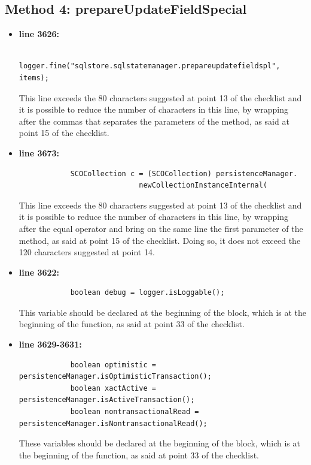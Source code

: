 \documentclass[18pt,oneside,a4paper, titlepage]{article}
\begin{document}
		\subsection{Method 4: prepareUpdateFieldSpecial}
		\begin{itemize}
			\item \textbf{line 3626:} \begin{lstlisting}
			logger.fine("sqlstore.sqlstatemanager.prepareupdatefieldspl", items);
			\end{lstlisting}
			\vspace{0.1cm}
			
			This line exceeds the 80 characters suggested at point 13 of the checklist and it is possible to reduce the number of characters in this line, by wrapping after the commas that separates the parameters of the method, as said at point 15 of the checklist.
			\item \textbf{line 3673:} \begin{lstlisting}
			SCOCollection c = (SCOCollection) persistenceManager.
							newCollectionInstanceInternal(
			\end{lstlisting}
			\vspace{0.1cm}
			This line exceeds the 80 characters suggested at point 13 of the checklist and it is possible to reduce the number of characters in this line, by wrapping after the equal operator and bring on the same line the first parameter of the method, as said at point 15 of the checklist. Doing so, it does not exceed the 120 characters suggested at point 14.
			\item \textbf{line 3622:} \begin{lstlisting}
			boolean debug = logger.isLoggable();
			\end{lstlisting}
			\vspace{0.1cm}
			This variable should be declared at the beginning of the block, which is at the beginning of the function, as said at point 33 of the checklist.
			\item \textbf{line 3629-3631:} \begin{lstlisting}
			boolean optimistic = persistenceManager.isOptimisticTransaction();
			boolean xactActive = persistenceManager.isActiveTransaction();
			boolean nontransactionalRead = persistenceManager.isNontransactionalRead();
			\end{lstlisting}
			\vspace{0.1cm}
			These variables should be declared at the beginning of the block, which is at the beginning of the function, as said at point 33 of the checklist.

\end{itemize}
\end{document}
